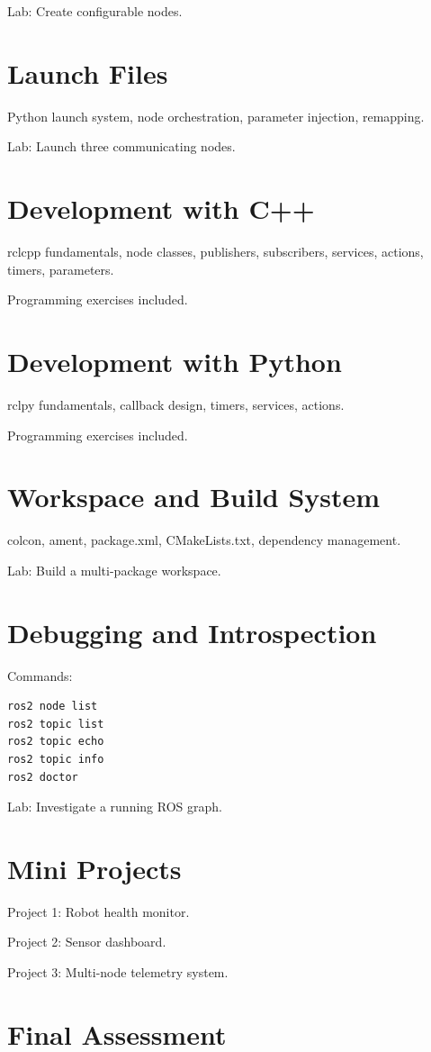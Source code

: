 \documentclass[11pt,oneside]{book}
\begin{document}
Lab:
Create configurable nodes.

\chapter{Launch Files}
Python launch system, node orchestration,
parameter injection, remapping.

Lab:
Launch three communicating nodes.

\chapter{Development with C++}
rclcpp fundamentals, node classes,
publishers, subscribers, services,
actions, timers, parameters.

Programming exercises included.

\chapter{Development with Python}
rclpy fundamentals, callback design,
timers, services, actions.

Programming exercises included.

\chapter{Workspace and Build System}
colcon, ament, package.xml,
CMakeLists.txt, dependency management.

Lab:
Build a multi-package workspace.

\chapter{Debugging and Introspection}
Commands:
\begin{verbatim}
ros2 node list
ros2 topic list
ros2 topic echo
ros2 topic info
ros2 doctor
\end{verbatim}

Lab:
Investigate a running ROS graph.

\chapter{Mini Projects}

Project 1:
Robot health monitor.

Project 2:
Sensor dashboard.

Project 3:
Multi-node telemetry system.

\chapter{Final Assessment}
\end{document}
